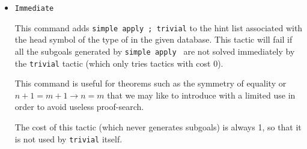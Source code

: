 \begin{coq_example*}
\begin{itemize}
\begin{ErrMsgs}
  \end{ErrMsgs}


\item \texttt{Immediate {\term}}

  This command adds {\tt simple apply {\term}; trivial} to the hint list
  associated with the head symbol of the type of {\ident} in the given
  database. This tactic will fail if all the subgoals generated by
  {\tt simple apply {\term}} are not solved immediately by the {\tt trivial}
  tactic (which only tries tactics with cost $0$).

  This command is useful for theorems such as the symmetry of equality
  or $n+1=m+1 \to n=m$ that we may like to introduce with a
  limited use in order to avoid useless proof-search.

  The cost of this tactic (which never generates subgoals) is always 1,
  so that it is not used by {\tt trivial} itself.


\end{itemize}
\end{coq_example*}
